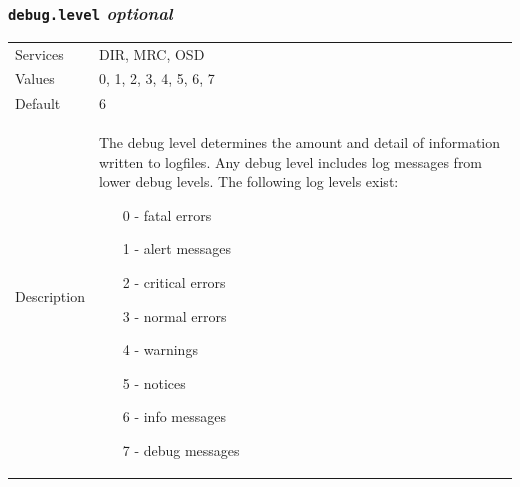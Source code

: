 \documentclass[a4paper,10pt]{book}
\begin{document}
\subsubsection{\texttt{debug.level} \textit{optional}}
\begin{tabular}{lp{10cm}}
 Services & DIR, MRC, OSD\\
 Values   & 0, 1, 2, 3, 4, 5, 6, 7 \\
 Default  & 6 \\
 Description & The debug level determines the amount and detail of information written to logfiles. Any debug level includes log messages from lower debug levels. The following log levels exist:
\begin{enumerate}
 \item[0 -] fatal errors
 \item[1 -] alert messages
 \item[2 -] critical errors
 \item[3 -] normal errors
 \item[4 -] warnings
 \item[5 -] notices
 \item[6 -] info messages
 \item[7 -] debug messages
\end{enumerate}
\end{tabular}
\end{document}
